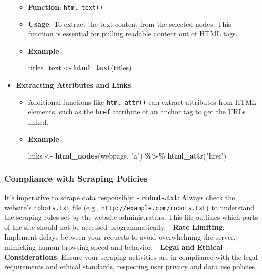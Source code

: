 \documentclass[
]{book}
\newenvironment{Shaded}{\begin{snugshade}}{\end{snugshade}}
\newcommand{\FunctionTok}[1]{\textcolor[rgb]{0.13,0.29,0.53}{\textbf{#1}}}
\newcommand{\NormalTok}[1]{#1}
\newcommand{\OtherTok}[1]{\textcolor[rgb]{0.56,0.35,0.01}{#1}}
\newcommand{\SpecialCharTok}[1]{\textcolor[rgb]{0.81,0.36,0.00}{\textbf{#1}}}
\newcommand{\StringTok}[1]{\textcolor[rgb]{0.31,0.60,0.02}{#1}}
\begin{document}
\begin{itemize}
  \begin{itemize}
  \item
    \textbf{Function}: \texttt{html\_text()}
  \item
    \textbf{Usage}: To extract the text content from the selected nodes. This function is essential for pulling readable content out of HTML tags.
  \item
    \textbf{Example}:

\begin{Shaded}
\begin{Highlighting}[]
\NormalTok{titles\_text }\OtherTok{\textless{}{-}} \FunctionTok{html\_text}\NormalTok{(titles)}
\end{Highlighting}
\end{Shaded}
  \end{itemize}
\item
  \textbf{Extracting Attributes and Links}:

  \begin{itemize}
  \item
    Additional functions like \texttt{html\_attr()} can extract attributes from HTML elements, such as the \texttt{href} attribute of an anchor tag to get the URLs linked.
  \item
    \textbf{Example}:

\begin{Shaded}
\begin{Highlighting}[]
\NormalTok{links }\OtherTok{\textless{}{-}} \FunctionTok{html\_nodes}\NormalTok{(webpage, }\StringTok{"a"}\NormalTok{) }\SpecialCharTok{\%\textgreater{}\%}
         \FunctionTok{html\_attr}\NormalTok{(}\StringTok{"href"}\NormalTok{)}
\end{Highlighting}
\end{Shaded}
  \end{itemize}
\end{itemize}

\hypertarget{compliance-with-scraping-policies}{%
\subsubsection{Compliance with Scraping Policies}\label{compliance-with-scraping-policies}}

It's imperative to scrape data responsibly: - \textbf{robots.txt}: Always check the website's \texttt{robots.txt} file (e.g., \texttt{http://example.com/robots.txt}) to understand the scraping rules set by the website administrators. This file outlines which parts of the site should not be accessed programmatically. - \textbf{Rate Limiting}: Implement delays between your requests to avoid overwhelming the server, mimicking human browsing speed and behavior. - \textbf{Legal and Ethical Considerations}: Ensure your scraping activities are in compliance with the legal requirements and ethical standards, respecting user privacy and data use policies.
\end{document}
